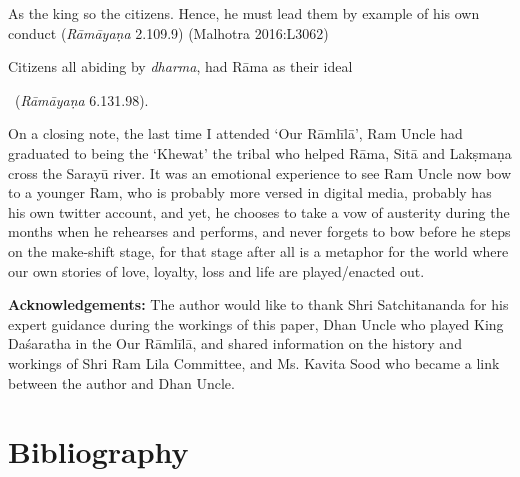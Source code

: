 \begin{myquote}
As the king so the citizens. Hence, he must lead them by example of his own conduct \hfill (\textit{Rāmāyaṇa} 2.109.9) (Malhotra 2016:L3062)
\end{myquote}

\vskip 4pt

\begin{myquote}
Citizens all abiding by \textit{dharma}, had Rāma as their ideal 

~\hfill (\textit{Rāmāyaṇa} 6.131.98).
\end{myquote}

On a closing note, the last time I attended ‘Our Rāmlīlā’, Ram Uncle had graduated to being the ‘Khewat’ the tribal who helped Rāma, Sitā and Lakṣmaṇa cross the Sarayū river. It was an emotional experience to see Ram Uncle now bow to a younger Ram, who is probably more versed in digital media, probably has his own twitter account, and yet, he chooses to take a vow of austerity during the months when he rehearses and performs, and never forgets to bow before he steps on the make-shift stage, for that stage after all is a metaphor for the world where our own stories of love, loyalty, loss and life are played/enacted out.

\newpage

\textbf{Acknowledgements:} The author would like to thank Shri Satchita\-nanda for his expert guidance during the workings of this paper, Dhan Uncle who played King Daśaratha in the Our Rāmlīlā, and shared information on the history and workings of Shri Ram Lila Committee, and Ms. Kavita Sood who became a link between the author and Dhan Uncle.


\section*{Bibliography}

